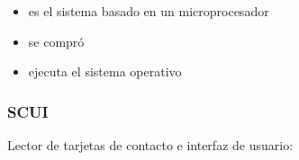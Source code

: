 \documentclass{beamer}
\begin{document}
\begin{frame}
\begin{itemize}
\item es el sistema basado en un microprocesador
\item se compró
\item ejecuta el sistema operativo
\end{itemize}
\end{frame}

\begin{frame}
	\frametitle{SCUI}
	Lector de tarjetas de contacto e interfaz de usuario:
	\begin{figure}
		\subfigure{ 
}
\end{figure}
\end{frame}
\end{document}
